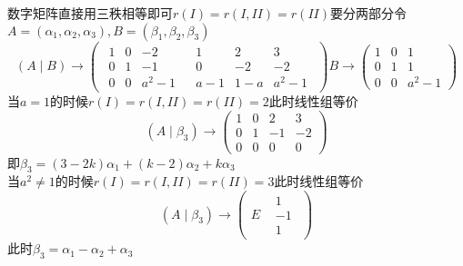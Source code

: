 \documentclass[12pt, a4paper, oneside, UTF8]{ctexbook}
\begin{document}
\begin{enumerate}
    \begin{solution}
    数字矩阵直接用三秩相等即可$r(I)=r(I,II)=r(II)$要分两部分令$A=(\alpha_1,\alpha_2,\alpha_3),B=(\beta_1,\beta_2,\beta_3)$
    $$
    (A\mid B)\rightarrow \left(\begin{array}{c|c}
        \begin{matrix}
            1 & 0 & -2 \\
            0 & 1 & -1 \\
            0 & 0 & a^2 -1 
        \end{matrix} & \begin{matrix}
            1 & 2 & 3 \\
            0 & -2 & -2 \\
            a-1 & 1-a & a^2 -1 
        \end{matrix}
    \end{array}\right)
    B \rightarrow \begin{pmatrix}
        1 & 0 & 1 \\
        0 & 1 & 1 \\
        0 & 0 & a^2-1
    \end{pmatrix}
    $$
    当$a=1$的时候$r(I)=r(I,II)=r(II)=2$此时线性组等价
    $$
    (A\mid\beta_3) \rightarrow \begin{pmatrix}
        1 & 0 & 2 & 3 \\
        0 & 1 & -1 & -2 \\
        0 & 0 & 0 & 0
    \end{pmatrix}
    $$
    即$\beta_3 = (3-2k)\alpha_1+(k-2)\alpha_2+k\alpha_3$ \\
    当$a^2\neq 1$的时候$r(I)=r(I,II)=r(II)=3$此时线性组等价
    $$
    (A\mid\beta_3)\rightarrow\begin{pmatrix}
        E & \begin{matrix}
            1 \\
            -1 \\
            1
        \end{matrix}
    \end{pmatrix}
    $$
    此时$\beta_3=\alpha_1-\alpha_2+\alpha_3$
    \end{solution}
\end{enumerate}
\end{document}
